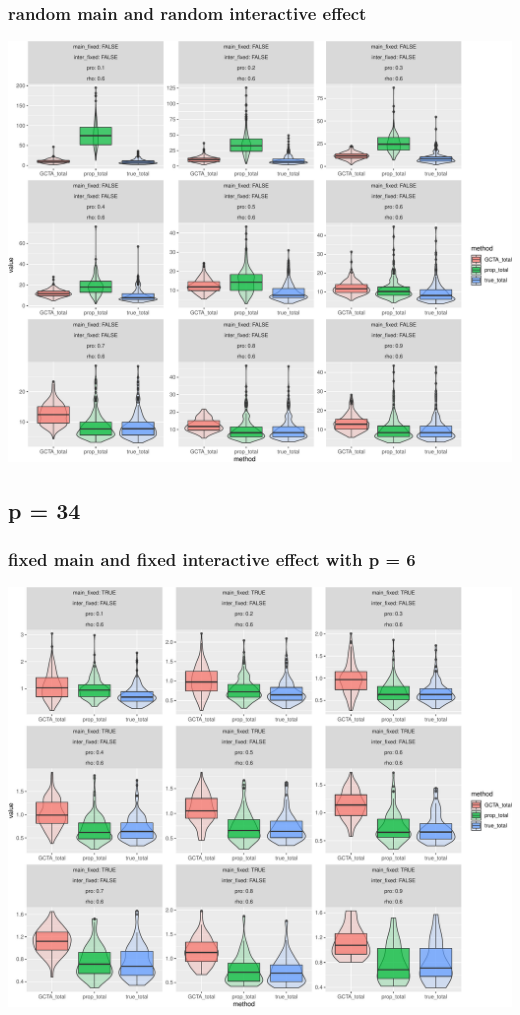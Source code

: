 \documentclass[]{article}
\begin{document}
\subsubsection{random main and random interactive
effect}\label{random-main-and-random-interactive-effect}

\includegraphics{Simulation_report_chi_resamle_files/figure-latex/random random-1.pdf}

\subsection{p = 34}\label{p-34-1}

\subsubsection{fixed main and fixed interactive effect with p =
6}\label{fixed-main-and-fixed-interactive-effect-with-p-6}

\includegraphics{Simulation_report_chi_resamle_files/figure-latex/fixed fixed p 6-1.pdf}
\end{document}
